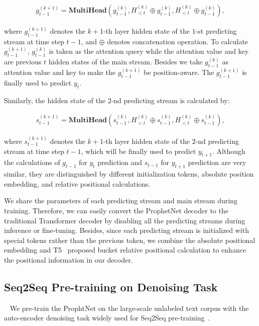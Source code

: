 \documentclass[11pt,a4paper]{article}
\begin{document}
\begin{small}
\begin{align}
    g^{(k+1)}_{t-1} = \textbf{MultiHead}(g^{(k)}_{t-1}, H^{(k)}_{<t} \oplus g^{(k)}_{t-1}, H^{(k)}_{<t}\oplus g^{(k)}_{t-1}),
\end{align}
\end{small}
where $g^{(k+1)}_{t-1}$ denotes the $k+1$-th layer hidden state of the $1$-st predicting stream at time step $t-1$, and $\oplus$ denotes concatenation operation. To calculate $g^{(k+1)}_{t-1}$, $g^{(k)}_{t-1}$ is taken as the attention query while the attention value and key are previous $t$ hidden states of the main stream. Besides we take $g^{(k)}_{t-1}$ as attention value and key to make the $g^{(k+1)}_{t-1}$ be position-aware. The $g^{(k+1)}_{t-1}$ is finally used to predict $y_{t}$.

Similarly, the hidden state of the $2$-nd predicting stream is calculated by:

\begin{small}
\begin{align}
    s^{(k+1)}_{t-1}= \textbf{MultiHead}(s^{(k)}_{t-1}, H^{(k)}_{<t} \oplus s^{(k)}_{t-1}, H^{(k)}_{<t}\oplus s^{(k)}_{t-1}),
\end{align}
\end{small}
where $s^{(k+1)}_{t-1}$ denotes the $k+1$-th layer hidden state of the $2$-nd predicting stream at time step $t-1$, which will be finally used to predict $y_{t+1}$.
Although the calculations of $g_{t-1}$ for $y_{t}$ prediction and $s_{t-1}$ for $y_{t+1}$ prediction are very similar, they are distinguished by different initialization tokens, absolute position embedding, and relative positional calculations.

We share the parameters of each predicting stream and main stream during training. 
Therefore, we can easily convert the ProphetNet decoder to the traditional Transformer decoder by disabling all the predicting streams during inference or fine-tuning. Besides, since each predicting stream is initialized with special tokens rather than the previous token, we combine the absolute positional embedding and T5~\cite{raffel2019exploring} proposed bucket relative positional calculation to enhance the positional information in our decoder. 

\subsection{Seq2Seq Pre-training on Denoising Task}~\label{sec:m4}
We pre-train the ProphtNet on the large-scale unlabeled text corpus with the auto-encoder denoising task widely used for Seq2Seq pre-training~\cite{song2019mass, lewis2019bart, raffel2019exploring}. 
\end{document}
